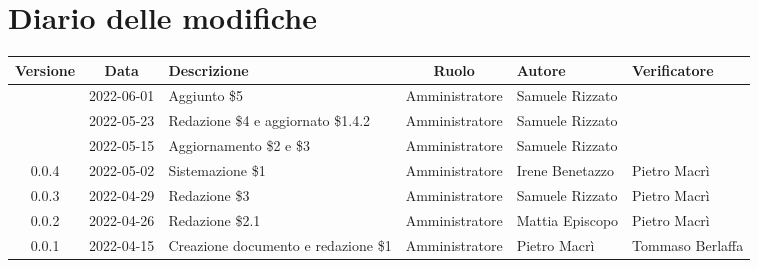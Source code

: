 \section*{Diario delle modifiche}
	\begin{center}
	\renewcommand{\arraystretch}{1.8} %
	\begin{longtable}{ |c|c|p{8em}|c|m{5em}|m{6em}| }
		\hline
		\textbf{Versione} & \textbf{Data} & \textbf{Descrizione} &  \textbf{Ruolo} &  \textbf{Autore} & \textbf{Verificatore} \\
		\hline
		 & 2022-06-01 & Aggiunto \$5 & Amministratore & Samuele \newline Rizzato & \\
		\hline
		 & 2022-05-23 & Redazione \$4 e aggiornato \$1.4.2 & Amministratore & Samuele \newline Rizzato & \\
		\hline
		 & 2022-05-15 & Aggiornamento \$2 e \$3 & Amministratore & Samuele \newline Rizzato & \\
		\hline
		0.0.4 & 2022-05-02 & Sistemazione \$1 & Amministratore & Irene \newline Benetazzo & Pietro \newline Macrì\\
		\hline
		0.0.3 & 2022-04-29 & Redazione \$3 & Amministratore & Samuele \newline Rizzato & Pietro \newline Macrì\\
		\hline
		0.0.2 & 2022-04-26 & Redazione \$2.1 & Amministratore & Mattia \newline Episcopo & Pietro \newline Macrì\\
		\hline
		0.0.1 & 2022-04-15 & Creazione documento e redazione \$1 & Amministratore & Pietro \newline Macrì & Tommaso \newline Berlaffa\\
		\hline
	\end{longtable}
	\end{center}
	\newpage